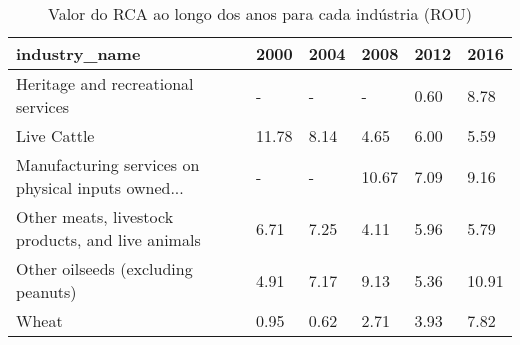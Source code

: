 \begin{table}
\centering
\caption{Valor do RCA ao longo dos anos para cada indústria (ROU)}
\begin{tabular}{p{6cm}p{1.5cm}p{1.5cm}p{1.5cm}p{1.5cm}p{1.5cm}}
\toprule
                                     industry\_name &  2000 & 2004 &  2008 & 2012 &  2016 \\
\midrule
                Heritage and recreational services &     - &    - &     - & 0.60 &  8.78 \\
                                       Live Cattle & 11.78 & 8.14 &  4.65 & 6.00 &  5.59 \\
Manufacturing services on physical inputs owned... &     - &    - & 10.67 & 7.09 &  9.16 \\
 Other meats, livestock products, and live animals &  6.71 & 7.25 &  4.11 & 5.96 &  5.79 \\
                Other oilseeds (excluding peanuts) &  4.91 & 7.17 &  9.13 & 5.36 & 10.91 \\
                                             Wheat &  0.95 & 0.62 &  2.71 & 3.93 &  7.82 \\
\bottomrule
\end{tabular}
\end{table}
